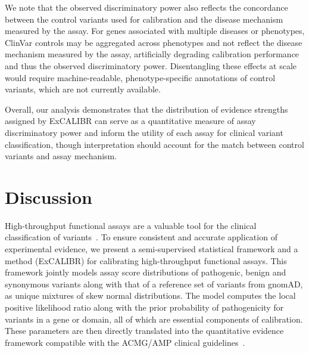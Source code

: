 \documentclass[11pt]{article}
\theoremstyle{plain}
\newcommand{\excalibr}{ExCALIBR\xspace}
\begin{document}
We note that the observed discriminatory power also reflects the concordance between the control variants used for calibration and the disease mechanism measured by the assay. For genes associated with multiple diseases or phenotypes, ClinVar controls may be aggregated across phenotypes and not reflect the disease mechanism measured by the assay, artificially degrading calibration performance and thus the observed discriminatory power. Disentangling these effects at scale would require machine-readable, phenotype-specific annotations of control variants, which are not currently available.

Overall, our analysis demonstrates that the distribution of evidence strengths assigned by \excalibr can serve as a quantitative measure of assay discriminatory power and %
inform the utility of each assay for clinical variant classification, though interpretation should account for the match between control variants and assay mechanism.



\section*{Discussion}

High-throughput functional assays are a valuable tool for the clinical classification of variants~\cite{igvfmarker}. To ensure consistent and accurate application of experimental evidence, we present a semi-supervised statistical framework and a method (\excalibr) for calibrating high-throughput functional assays. This framework jointly models assay score distributions of pathogenic, benign and synonymous variants along with that of a reference set of variants from gnomAD, as unique mixtures of skew normal distributions. The model computes the local positive likelihood ratio along with the prior probability of pathogenicity for variants in a gene or domain, all of which are essential components of calibration. These parameters are then directly translated into the quantitative evidence framework compatible with the ACMG/AMP clinical guidelines~\cite{Tavtigian2020}.
\end{document}
